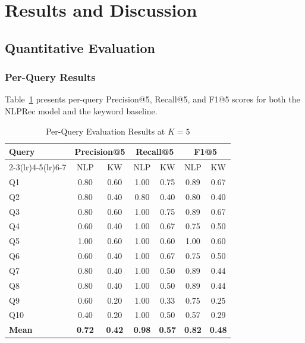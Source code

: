 \documentclass[12pt, a4paper]{article}
\begin{document}
\section{Results and Discussion}
\label{sec:discussion}

\subsection{Quantitative Evaluation}

\subsubsection{Per-Query Results}

Table~\ref{tab:per_query} presents per-query Precision@5, Recall@5, and F1@5 scores for
both the NLPRec model and the keyword baseline.

\begin{table}[htbp]
\centering
\caption{Per-Query Evaluation Results at $K=5$}
\label{tab:per_query}
\renewcommand{\arraystretch}{1.2}
\begin{tabular}{lcccccc}
\toprule
\multirow{2}{*}{\textbf{Query}} &
\multicolumn{2}{c}{\textbf{Precision@5}} &
\multicolumn{2}{c}{\textbf{Recall@5}} &
\multicolumn{2}{c}{\textbf{F1@5}} \\
\cmidrule(lr){2-3}\cmidrule(lr){4-5}\cmidrule(lr){6-7}
 & NLP & KW & NLP & KW & NLP & KW \\
\midrule
Q1  & 0.80 & 0.60 & 1.00 & 0.75 & 0.89 & 0.67 \\
Q2  & 0.80 & 0.40 & 0.80 & 0.40 & 0.80 & 0.40 \\
Q3  & 0.80 & 0.60 & 1.00 & 0.75 & 0.89 & 0.67 \\
Q4  & 0.60 & 0.40 & 1.00 & 0.67 & 0.75 & 0.50 \\
Q5  & 1.00 & 0.60 & 1.00 & 0.60 & 1.00 & 0.60 \\
Q6  & 0.60 & 0.40 & 1.00 & 0.67 & 0.75 & 0.50 \\
Q7  & 0.80 & 0.40 & 1.00 & 0.50 & 0.89 & 0.44 \\
Q8  & 0.80 & 0.40 & 1.00 & 0.50 & 0.89 & 0.44 \\
Q9  & 0.60 & 0.20 & 1.00 & 0.33 & 0.75 & 0.25 \\
Q10 & 0.40 & 0.20 & 1.00 & 0.50 & 0.57 & 0.29 \\
\midrule
\textbf{Mean} & \textbf{0.72} & \textbf{0.42} & \textbf{0.98} & \textbf{0.57} & \textbf{0.82} & \textbf{0.48} \\
\bottomrule
\end{tabular}
\end{table}
\end{document}
